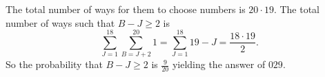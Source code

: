 The total number of ways for them to choose numbers is $20\cdot19$. The total number of ways such that $B-J\geq2$ is \[\displaystyle\sum_{J=1}^{18}\displaystyle\sum_{B=J+2}^{20}1=\displaystyle\sum_{J=1}^{18}19-J=\frac{18\cdot19}{2}.\] So the probability that $B-J\geq2$ is $\frac{9}{20}$ yielding the answer of $\boxed{029}$.